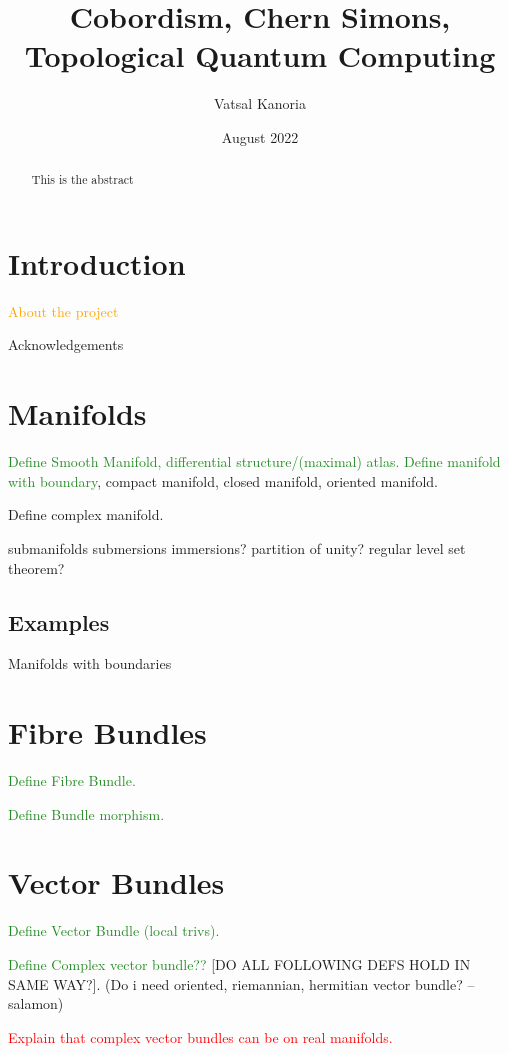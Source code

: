 \documentclass[a4paper]{article}
\theoremstyle{definition} \newtheorem*{definition}{Definition}
\theoremstyle{definition} \newtheorem*{definitions}{Definitions}
\theoremstyle{plain} \newtheorem{theorem}{Theorem}[section]
\theoremstyle{plain} \newtheorem{proposition}[theorem]{Proposition}
\theoremstyle{plain} \newtheorem{corollary}[theorem]{Corollary}
\theoremstyle{plain} \newtheorem{lemma}[theorem]{Lemma}
\theoremstyle{plain} \newtheorem{example}[theorem]{Example}
\newcommand{\done}[1]{\textcolor{ForestGreen}{#1}}
\newcommand{\finish}[1]{\textcolor{orange}{#1}}
\newcommand{\checkCorrect}[1]{\textcolor{red}{#1}}
\begin{document}
\title{Cobordism, Chern Simons, Topological Quantum Computing}
\author{Vatsal Kanoria}
\date{August 2022}
\maketitle
\begin{abstract}
This is the abstract
\end{abstract}
\tableofcontents

\section{Introduction}

\finish{About the project}

Acknowledgements

\section{Manifolds}

\done{Define Smooth Manifold, differential structure/(maximal) atlas.
Define manifold with boundary}, 
compact manifold, closed manifold, oriented manifold.

Define complex manifold.

submanifolds submersions immersions? partition of unity? regular level set theorem?

\subsection{Examples}

Manifolds with boundaries

\section{Fibre Bundles}

\done{Define Fibre Bundle.}

\done{Define Bundle morphism.}

\section{Vector Bundles}

\done{Define Vector Bundle (local trivs).}

\done{Define Complex vector bundle??} [DO ALL FOLLOWING DEFS HOLD IN SAME WAY?]. (Do i need oriented, riemannian, hermitian vector bundle? -- salamon)

\checkCorrect{Explain that complex vector bundles can be on real manifolds.}
\end{document}

